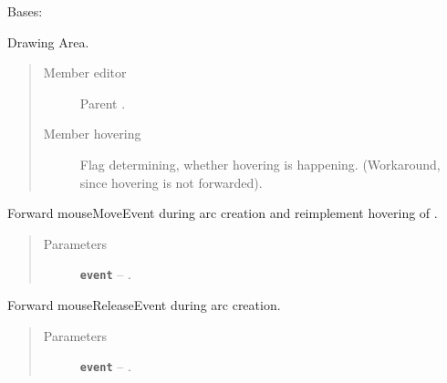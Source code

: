\documentclass[a4paper,10pt,english]{sphinxmanual}
\begin{document}
\begin{fulllineitems}
\label{gui_link:gui.DiagramScene.DiagramScene}
Bases: 

Drawing Area.
\begin{quote}\begin{description}
\item[{Member editor}] \leavevmode
Parent .

\item[{Member hovering}] \leavevmode
Flag determining, whether hovering is happening. (Workaround, since hovering is not forwarded).

\end{description}\end{quote}

\begin{fulllineitems}
\label{gui_link:gui.DiagramScene.DiagramScene.mouseMoveEvent}
Forward mouseMoveEvent during arc creation and reimplement hovering of .
\begin{quote}\begin{description}
\item[{Parameters}] \leavevmode
\textbf{\texttt{event}} -- .

\end{description}\end{quote}

\end{fulllineitems}


\begin{fulllineitems}
\label{gui_link:gui.DiagramScene.DiagramScene.mouseReleaseEvent}
Forward mouseReleaseEvent during arc creation.
\begin{quote}\begin{description}
\item[{Parameters}] \leavevmode
\textbf{\texttt{event}} -- .

\end{description}\end{quote}

\end{fulllineitems}


\end{fulllineitems}
\end{document}
